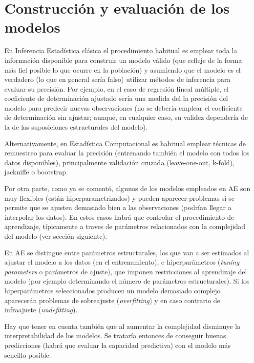 \documentclass[]{book}
\theoremstyle{break}
\theoremstyle{definition}
\theoremstyle{definition}
\theoremstyle{definition}
\theoremstyle{remark}
\begin{document}
\section{Construcción y evaluación de los modelos}\label{const-eval}

En Inferencia Estadística clásica el procedimiento habitual es emplear
toda la información disponible para construir un modelo válido (que
refleje de la forma más fiel posible lo que ocurre en la población) y
asumiendo que el modelo es el verdadero (lo que en general sería falso)
utilizar métodos de inferencia para evaluar su precisión. Por ejemplo,
en el caso de regresión lineal múltiple, el coeficiente de determinación
ajustado sería una medida del la precisión del modelo para predecir
nuevas observaciones (no se debería emplear el coeficiente de
determinación sin ajustar; aunque, en cualquier caso, su validez
dependería de la de las suposiciones estructurales del modelo).

Alternativamente, en Estadística Computacional es habitual emplear
técnicas de remuestreo para evaluar la precisión (entrenando también el
modelo con todos los datos disponibles), principalmente validación
cruzada (leave-one-out, k-fold), jackniffe o bootstrap.

Por otra parte, como ya se comentó, algunos de los modelos empleados en
AE son muy flexibles (están hiperparametrizados) y pueden aparecer
problemas si se permite que se ajusten demasiado bien a las
observaciones (podrían llegar a interpolar los datos). En estos casos
habrá que controlar el procedimiento de aprendizaje, típicamente a
traves de parámetros relacionados con la complejidad del modelo (ver
sección siguiente).

En AE se distingue entre parámetros estructurales, los que van a ser
estimados al ajustar el modelo a los datos (en el entrenamiento), e
hiperparámetros (\emph{tuning parameters} o parámetros de ajuste), que
imponen restricciones al aprendizaje del modelo (por ejemplo
determinando el número de parámetros estructurales). Si los
hiperparámetros seleccionados producen un modelo demasiado complejo
aparecerán problemas de sobreajuste (\emph{overfitting}) y en caso
contrario de infraajuste (\emph{undefitting}).

Hay que tener en cuenta también que al aumentar la complejidad disminuye
la interpretabilidad de los modelos. Se trataría entonces de conseguir
buenas predicciones (habrá que evaluar la capacidad predictiva) con el
modelo más sencillo posible.
\end{document}
